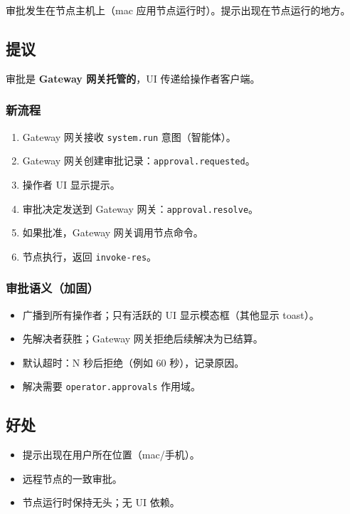 审批发生在节点主机上（mac 应用节点运行时）。提示出现在节点运行的地方。

\subsection{提议}


审批是 \textbf{Gateway 网关托管的}，UI 传递给操作者客户端。

\subsubsection{新流程}


\begin{enumerate}
  \item Gateway 网关接收 \texttt{system.run} 意图（智能体）。
  \item Gateway 网关创建审批记录：\texttt{approval.requested}。
  \item 操作者 UI 显示提示。
  \item 审批决定发送到 Gateway 网关：\texttt{approval.resolve}。
  \item 如果批准，Gateway 网关调用节点命令。
  \item 节点执行，返回 \texttt{invoke-res}。
\end{enumerate}


\subsubsection{审批语义（加固）}


\begin{itemize}
  \item 广播到所有操作者；只有活跃的 UI 显示模态框（其他显示 toast）。
  \item 先解决者获胜；Gateway 网关拒绝后续解决为已结算。
  \item 默认超时：N 秒后拒绝（例如 60 秒），记录原因。
  \item 解决需要 \texttt{operator.approvals} 作用域。
\end{itemize}


\subsection{好处}


\begin{itemize}
  \item 提示出现在用户所在位置（mac/手机）。
  \item 远程节点的一致审批。
  \item 节点运行时保持无头；无 UI 依赖。
\end{itemize}


